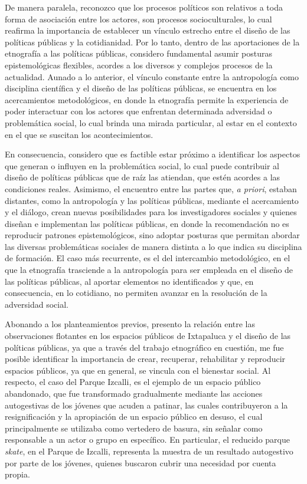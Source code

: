 \documentclass[
  spanish,
  11pt,
  a4paper,
]{scrbook}
\begin{document}
De manera paralela, reconozco que los procesos políticos son relativos a
toda forma de asociación entre los actores, son procesos
socioculturales, lo cual reafirma la importancia de establecer un
vínculo estrecho entre el diseño de las políticas públicas y la
cotidianidad. Por lo tanto, dentro de las aportaciones de la etnografía
a las políticas públicas, considero fundamental asumir posturas
epistemológicas flexibles, acordes a los diversos y complejos procesos
de la actualidad. Aunado a lo anterior, el vínculo constante entre la
antropología como disciplina científica y el diseño de las políticas
públicas, se encuentra en los acercamientos metodológicos, en donde la
etnografía permite la experiencia de poder interactuar con los actores
que enfrentan determinada adversidad o problemática social, lo cual
brinda una mirada particular, al estar en el contexto en el que se
suscitan los acontecimientos.

En consecuencia, considero que es factible estar próximo a identificar
los aspectos que generan o influyen en la problemática social, lo cual
puede contribuir al diseño de políticas públicas que de raíz las
atiendan, que estén acordes a las condiciones reales. Asimismo, el
encuentro entre las partes que, \emph{a priori}, estaban distantes, como
la antropología y las políticas públicas, mediante el acercamiento y el
diálogo, crean nuevas posibilidades para los investigadores sociales y
quienes diseñan e implementan las políticas públicas, en donde la
recomendación no es reproducir patrones epistemológicos, sino adoptar
posturas que permitan abordar las diversas problemáticas sociales de
manera distinta a lo que indica su disciplina de formación. El caso más
recurrente, es el del intercambio metodológico, en el que la etnografía
trasciende a la antropología para ser empleada en el diseño de las
políticas públicas, al aportar elementos no identificados y que, en
consecuencia, en lo cotidiano, no permiten avanzar en la resolución de
la adversidad social.

Abonando a los planteamientos previos, presento la relación entre las
observaciones flotantes en los espacios públicos de Ixtapaluca y el
diseño de las políticas públicas, ya que a través del trabajo
etnográfico en cuestión, me fue posible identificar la importancia de
crear, recuperar, rehabilitar y reproducir espacios públicos, ya que en
general, se vincula con el bienestar social. Al respecto, el caso del
Parque Izcalli, es el ejemplo de un espacio público abandonado, que fue
transformado gradualmente mediante las acciones autogestivas de los
jóvenes que acuden a patinar, las cuales contribuyeron a la
resignificación y la apropiación de un espacio público en desuso, el
cual principalmente se utilizaba como vertedero de basura, sin señalar
como responsable a un actor o grupo en específico. En particular, el
reducido parque \emph{skate}, en el Parque de Izcalli, representa la
muestra de un resultado autogestivo por parte de los jóvenes, quienes
buscaron cubrir una necesidad por cuenta propia.
\end{document}
